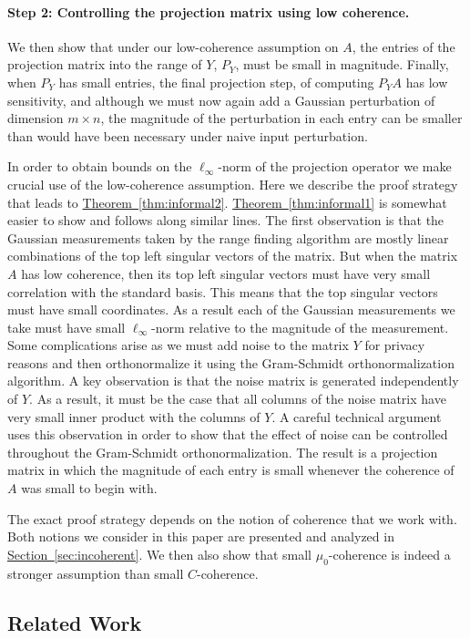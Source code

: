 \documentclass[letterpaper,11pt]{article}
\theoremstyle{definition}
\newcommand{\sectionref}[1]{\hyperref[sec:#1]{Section~\ref{sec:#1}}}
\newcommand{\theoremref}[1]{\hyperref[thm:#1]{Theorem~\ref{thm:#1}}}
\begin{document}
\paragraph{Step 2: Controlling the projection matrix using low coherence.}
We then show that under our low-coherence
assumption on $A$, the entries of the projection matrix into the range of $Y$,
$P_Y$, must be small in magnitude.
Finally, when $P_Y$ has small entries, the final
projection step, of computing $P_YA$ has low sensitivity, and although we must
now again add a Gaussian perturbation of dimension $m \times n$, the magnitude
of the perturbation in each entry can be smaller than would have been
necessary under naive input perturbation.

In order to obtain bounds on the $\ell_\infty$-norm of the projection operator
we make crucial use of the low-coherence assumption. Here we describe the
proof strategy that leads to \theoremref{informal2}. \theoremref{informal1} is
somewhat easier to show and follows along similar lines.
The first observation is that the Gaussian measurements
taken by the range finding algorithm are mostly linear combinations of the top
left singular vectors of the matrix. But when the matrix $A$ has low coherence,
then its top left singular vectors must have very small correlation with the
standard basis. This means that the top singular vectors must have small
coordinates. As a result each of the Gaussian measurements we take must have
small $\ell_\infty$-norm relative to the magnitude of the measurement. Some
complications arise as we must add noise to the matrix $Y$ for privacy reasons and
then orthonormalize it using the Gram-Schmidt orthonormalization algorithm.
A key observation is that the noise matrix is generated independently of $Y$.
As a result, it must be the case that all columns of the noise matrix have
very small inner product with the columns of $Y.$ A careful technical argument
uses this observation in order to show that the effect of noise can be
controlled throughout the Gram-Schmidt orthonormalization. The result is a
projection matrix in which the magnitude of each entry is small whenever the
coherence of~$A$ was small to begin with.

The exact proof strategy depends on the notion of coherence that we work with.
Both notions we consider in this paper are presented and analyzed in
\sectionref{incoherent}. We then also show that small $\mu_0$-coherence is indeed a
stronger assumption than small $C$-coherence.

\subsection{Related Work}
\end{document}
